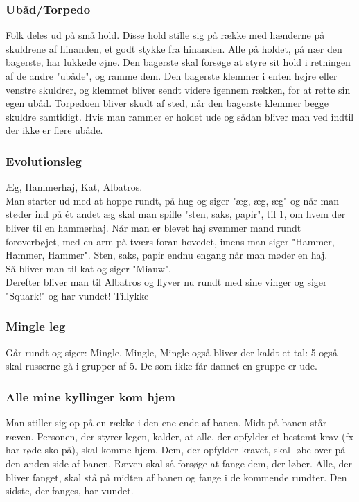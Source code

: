 \begin{multicols}{2}
\subsubsection*{Ubåd/Torpedo}
Folk deles ud på små hold. Disse hold stille sig på række med hænderne på skuldrene af hinanden, et godt stykke fra hinanden. Alle på holdet, på nær den bagerste, har lukkede øjne. Den bagerste skal forsøge at styre sit hold i retningen af de andre "ubåde", og ramme dem. Den bagerste klemmer i enten højre eller venstre skuldrer, og klemmet bliver sendt videre igennem rækken, for at rette sin egen ubåd. Torpedoen bliver skudt af sted, når den bagerste klemmer begge skuldre samtidigt. Hvis man rammer er holdet ude og sådan bliver man ved indtil der ikke er flere ubåde. 

\subsubsection*{Evolutionsleg}
Æg, Hammerhaj, Kat, Albatros.\\
Man starter ud med at hoppe rundt, på hug og siger "æg, æg, æg" og når man støder ind på ét andet æg skal man spille "sten, saks, papir", til 1, om hvem der bliver til en hammerhaj. Når man er blevet haj svømmer mand rundt foroverbøjet, med en arm på tværs foran hovedet, imens man siger "Hammer, Hammer, Hammer". Sten, saks, papir endnu engang når man møder en haj. \\

Så bliver man til kat og siger "Miauw". \\

Derefter bliver man til Albatros og flyver nu rundt med sine vinger og siger "Squark!" og har vundet! Tillykke

\subsubsection*{Mingle leg}
Går rundt og siger: Mingle, Mingle, Mingle også bliver der kaldt et tal: 5 også skal russerne gå i grupper af 5. De som ikke får dannet en gruppe er ude.

\subsubsection*{Alle mine kyllinger kom hjem}
Man stiller sig op på en række i den ene ende af banen. Midt på banen står ræven. Personen, der styrer legen, kalder, at alle, der opfylder et bestemt krav (fx har røde sko på), skal komme hjem. Dem, der opfylder kravet, skal løbe over på den anden side af banen. Ræven skal så forsøge at fange dem, der løber. Alle, der bliver fanget, skal stå på midten af banen og fange i de kommende rundter. Den sidste, der fanges, har vundet.


\end{multicols}
